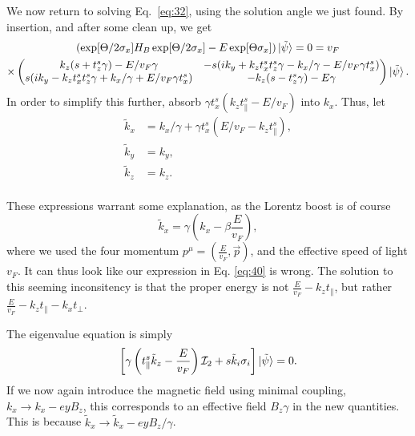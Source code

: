We now return to solving Eq.~\eqref{eq:32}, using the solution angle we just found.
By insertion, and after some clean up, we get
\begin{multline}
  \label{eq:39}
  (\exp[\Theta /2 \sigma_{x}] H_{B}\exp[\Theta /2 \sigma_{x}] - E \exp[\Theta \sigma_{x}]) \ket{\tilde{\psi}} = 0
  = v_F \\
  \times \begin{pmatrix}
          k_z ( s + t^s_z \gamma ) - E / v_F \gamma & -s ( ik_y + k_z t^s_x t^s_z \gamma - k_x / \gamma - E /v_{F} \gamma t^s_x)\\
          s ( i k_y - k_z t^s_x t^s_z \gamma + k_x / \gamma + E /v_F \gamma t^s_x) & - k_z (s - t^s_z \gamma) - E \gamma
        \end{pmatrix}
    \ket{\tilde{\psi}}.
\end{multline}
In order to simplify this further, absorb \(\gamma t^s_x (k_{z} t^s_{\parallel} - E /v_{F}) \) into \(k_{x}\).
Thus, let
\begin{equation}
  \label{eq:40}
  \begin{split}
    \tilde{k}_{x} &= k_{x} / \gamma + \gamma t^s_x ( E /v_F - k_{z} t^s_{\parallel}),\\
    \tilde{k}_{y} &=  k_{y},\\
    \tilde{k}_{z} &=  k_{z}.\\
  \end{split}
\end{equation}

These expressions warrant some explanation, as the Lorentz boost is of course
\begin{equation}
  \label{eq:41}
  \tilde{k}_x = \gamma (k_x - \beta \frac{E}{v_{F}}),
\end{equation}
where we used the four momentum \( p^{\mu } = (\frac{E}{v_{F}}, \vec{p}) \), and the effective speed of light \( v_F \).
It can thus look like our expression in Eq. \eqref{eq:40} is wrong.
The solution to this seeming inconsitency is that the proper energy is not \( \frac{E}{v_{F}} - k_z t_{\parallel} \), but rather \( \frac{E}{v_{F}} - k_z t_{\parallel} - k_x t_{\perp}\).

The eigenvalue equation is simply
\begin{equation}
  \label{eq:42}
  \left[  \gamma \left( t^s_{\parallel} \tilde{k}_{z} - \frac{E}{v_{F}} \right) \mathcal{I}_{2} +
  s \tilde{k}_{i} \sigma _{i} \right] \ket{\tilde{\psi}}= 0.
\end{equation}
If we now again introduce the magnetic field using minimal coupling, \(k_{x} \to  k_{x} - ey B_{z} \), this corresponds to an effective field \(B_{z} \gamma \) in the new quantities.
This is because \(\tilde{k}_{x} \to  \tilde{k}_{x} - e y B_{z} /\gamma \).

